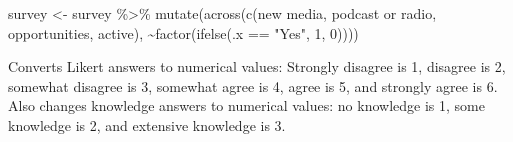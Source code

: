 \documentclass[
]{article}
\newenvironment{Shaded}{\begin{snugshade}}{\end{snugshade}}
\newcommand{\AttributeTok}[1]{\textcolor[rgb]{0.77,0.63,0.00}{#1}}
\newcommand{\DecValTok}[1]{\textcolor[rgb]{0.00,0.00,0.81}{#1}}
\newcommand{\FunctionTok}[1]{\textcolor[rgb]{0.00,0.00,0.00}{#1}}
\newcommand{\NormalTok}[1]{#1}
\newcommand{\OtherTok}[1]{\textcolor[rgb]{0.56,0.35,0.01}{#1}}
\newcommand{\SpecialCharTok}[1]{\textcolor[rgb]{0.00,0.00,0.00}{#1}}
\newcommand{\StringTok}[1]{\textcolor[rgb]{0.31,0.60,0.02}{#1}}
\begin{document}
\begin{Shaded}
\begin{Highlighting}[]
\NormalTok{survey }\OtherTok{\textless{}{-}}\NormalTok{ survey }\SpecialCharTok{\%\textgreater{}\%}
    \FunctionTok{mutate}\NormalTok{(}\FunctionTok{across}\NormalTok{(}\FunctionTok{c}\NormalTok{(}\StringTok{\textasciigrave{}}\AttributeTok{new media}\StringTok{\textasciigrave{}}\NormalTok{, }\StringTok{\textasciigrave{}}\AttributeTok{podcast or radio}\StringTok{\textasciigrave{}}\NormalTok{, opportunities,}
\NormalTok{        active), }\SpecialCharTok{\textasciitilde{}}\FunctionTok{factor}\NormalTok{(}\FunctionTok{ifelse}\NormalTok{(.x }\SpecialCharTok{==} \StringTok{"Yes"}\NormalTok{, }\DecValTok{1}\NormalTok{, }\DecValTok{0}\NormalTok{))))}
\end{Highlighting}
\end{Shaded}

Converts Likert answers to numerical values: Strongly disagree is 1,
disagree is 2, somewhat disagree is 3, somewhat agree is 4, agree is 5,
and strongly agree is 6. Also changes knowledge answers to numerical
values: no knowledge is 1, some knowledge is 2, and extensive knowledge
is 3.
\end{document}
